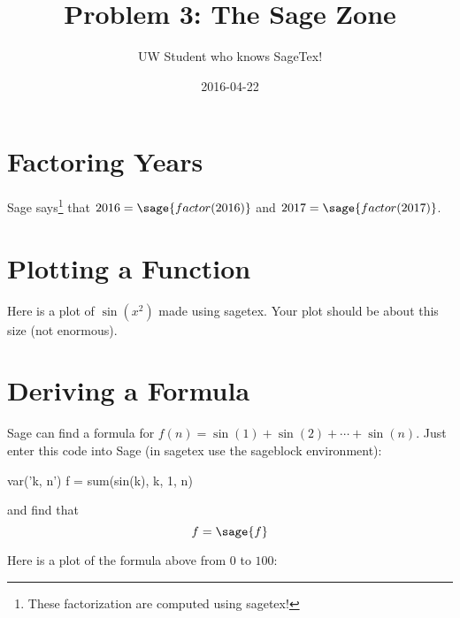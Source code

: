 \documentclass{article}
\title{Problem 3: The Sage Zone}
\author{UW Student who knows SageTex!}
\date{2016-04-22}
\begin{document}
\maketitle

\section{Factoring Years\label{years}}
Sage says\footnote{These factorization are
computed using sagetex!} that $2016=\sage{factor(2016)}$ and
$2017=\sage{factor(2017)}$.

\section{Plotting a Function\label{plotting}}
Here is a plot of $\sin(x^2)$ made using sagetex.  Your
plot should be about this size (not enormous).
\vspace{.5in}


\section{Deriving a Formula\label{formula}}

Sage can find a formula for
$
 f(n) = \sin(1) + \sin(2) + \cdots + \sin(n).
$
Just enter this code into Sage (in sagetex use the sageblock environment):
\begin{sageblock}
var('k, n')
f = sum(sin(k), k, 1, n)
\end{sageblock}
and find that
{\tiny
$$
f = \sage{f}
$$
}

Here is a plot of the formula above from $0$ to $100$:

\end{document}

